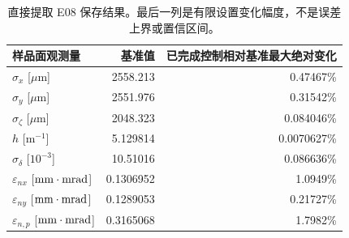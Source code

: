 \begin{table}[H]\centering\small
\begin{tabular}{lrr}\toprule
样品面观测量 & 基准值 & 已完成控制相对基准最大绝对变化 \\ \midrule
$\sigma_x$ [$\mu$m] & 2558.213 & 0.47467\% \\
$\sigma_y$ [$\mu$m] & 2551.976 & 0.31542\% \\
$\sigma_\zeta$ [$\mu$m] & 2048.323 & 0.084046\% \\
$h$ [m$^{-1}$] & 5.129814 & 0.0070627\% \\
$\sigma_\delta$ [$10^{-3}$] & 10.51016 & 0.086636\% \\
$\varepsilon_{nx}$ [$\mathrm{mm\cdot mrad}$] & 0.1306952 & 1.0949\% \\
$\varepsilon_{ny}$ [$\mathrm{mm\cdot mrad}$] & 0.1289053 & 0.21727\% \\
$\varepsilon_{n,p}$ [$\mathrm{mm\cdot mrad}$] & 0.3165068 & 1.7982\% \\
\bottomrule\end{tabular}
\caption{直接提取 E08 保存结果。最后一列是有限设置变化幅度，不是误差上界或置信区间。}
\end{table}
